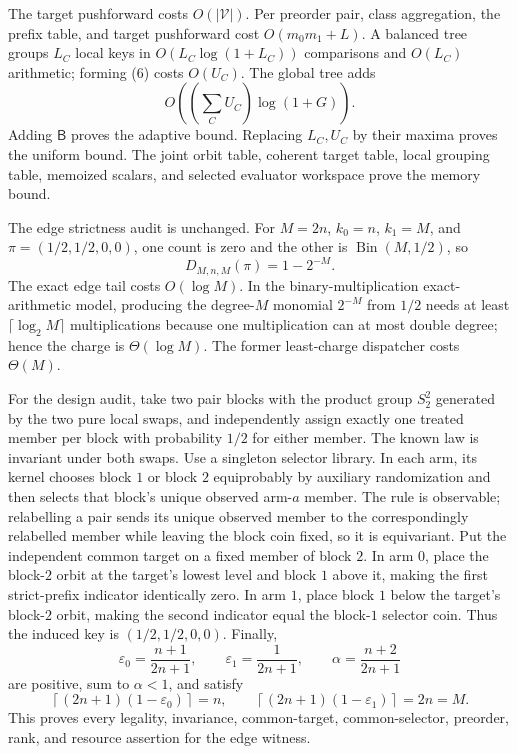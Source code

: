 The target pushforward costs \(O(|\mathcal V|)\). Per preorder pair, class aggregation, the prefix table, and target pushforward cost
\(O(m_0m_1+L)\). A balanced tree groups \(L_C\) local keys in
\(O(L_C\log(1+L_C))\) comparisons and \(O(L_C)\) arithmetic; forming (6) costs \(O(U_C)\). The global tree adds
\[
O\!\left(\left(\sum_CU_C\right)\log(1+G)\right).
\]
Adding \(\mathsf B\) proves the adaptive bound. Replacing \(L_C,U_C\) by their maxima proves the uniform bound. The joint orbit table, coherent target table, local grouping table, memoized scalars, and selected evaluator workspace prove the memory bound.

The edge strictness audit is unchanged. For \(M=2n\), \(k_0=n\), \(k_1=M\), and \(\pi=(1/2,1/2,0,0)\), one count is zero and the other is
\(\operatorname{Bin}(M,1/2)\), so
\[
D_{M,n,M}(\pi)=1-2^{-M}.
\]
The exact edge tail costs \(O(\log M)\). In the binary-multiplication exact-arithmetic model, producing the degree-\(M\) monomial \(2^{-M}\) from \(1/2\) needs at least \(\lceil\log_2 M\rceil\) multiplications because one multiplication can at most double degree; hence the charge is \(\Theta(\log M)\). The former least-charge dispatcher costs \(\Theta(M)\).

For the design audit, take two pair blocks with the product group \(S_2^2\) generated by the two pure local swaps, and independently assign exactly one treated member per block with probability \(1/2\) for either member. The known law is invariant under both swaps. Use a singleton selector library. In each arm, its kernel chooses block \(1\) or block \(2\) equiprobably by auxiliary randomization and then selects that block's unique observed arm-\(a\) member. The rule is observable; relabelling a pair sends its unique observed member to the correspondingly relabelled member while leaving the block coin fixed, so it is equivariant. Put the independent common target on a fixed member of block \(2\). In arm \(0\), place the block-\(2\) orbit at the target's lowest level and block \(1\) above it, making the first strict-prefix indicator identically zero. In arm \(1\), place block \(1\) below the target's block-\(2\) orbit, making the second indicator equal the block-\(1\) selector coin. Thus the induced key is \((1/2,1/2,0,0)\). Finally,
\[
\varepsilon_0=\frac{n+1}{2n+1},\qquad
\varepsilon_1=\frac1{2n+1},\qquad
\alpha=\frac{n+2}{2n+1}
\]
are positive, sum to \(\alpha<1\), and satisfy
\[
\left\lceil(2n+1)(1-\varepsilon_0)\right\rceil=n,\qquad
\left\lceil(2n+1)(1-\varepsilon_1)\right\rceil=2n=M.
\]
This proves every legality, invariance, common-target, common-selector, preorder, rank, and resource assertion for the edge witness.

